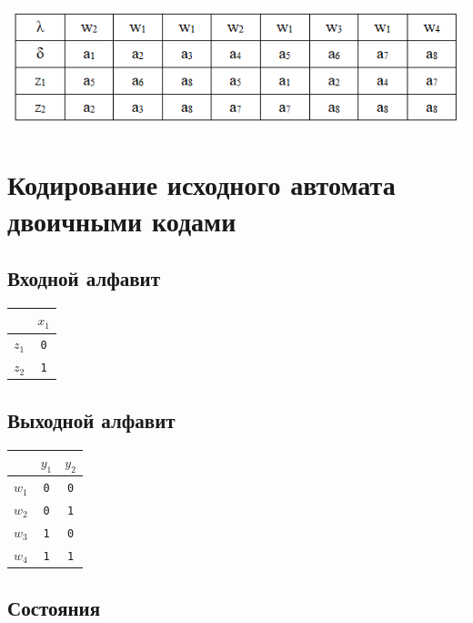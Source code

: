 \documentclass[12pt, a4paper]{article}
\begin{document}
\begin{center}
  \includegraphics{task.png}
\end{center}

\section*{Кодирование исходного автомата двоичными кодами}

\subsection*{Входной алфавит}

\begin{tabular}{| c | c |}
  \hline
  & $x_1$\\
  \hline
  $z_1$ & \texttt{0}\\
  $z_2$ & \texttt{1}\\
  \hline
\end{tabular}

\subsection*{Выходной алфавит}

\begin{tabular}{| c | c | c |}
  \hline
  & $y_1$ & $y_2$\\
  \hline
  $w_1$ & \texttt{0} & \texttt{0}\\
  $w_2$ & \texttt{0} & \texttt{1}\\
  $w_3$ & \texttt{1} & \texttt{0}\\
  $w_4$ & \texttt{1} & \texttt{1}\\
  \hline
\end{tabular}

\subsection*{Состояния}
\end{document}
